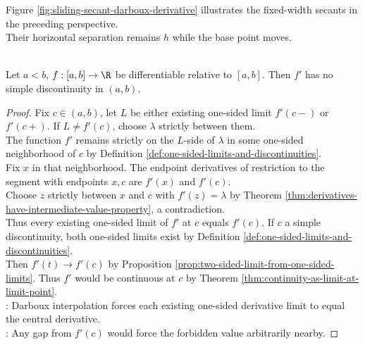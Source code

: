 \noindent Figure \ref{fig:sliding-secant-darboux-derivative} illustrates the fixed-width secants in the preceding perspective.\\
Their horizontal separation remains $h$ while the base point moves.

\begin{illustrationfigure}[H]
  \centering
  
  \caption{Fixed-width secants slide across the graph while retaining horizontal separation $h$.}
  \label{fig:sliding-secant-darboux-derivative}
\end{illustrationfigure}

\begin{corollary} \label{cor:derivatives-no-simple-discontinuities} \\
Let $a<b$, $f:[a,b]\to\R$ be differentiable relative to $[a,b]$. Then $f'$ has no simple discontinuity in $(a,b)$.
\begin{proof}
Fix $c\in(a,b)$, let $L$ be either existing one-sided limit $f'(c-)$ or $f'(c+)$. If $L\neq f'(c)$, choose $\lambda$ strictly between them.\\
The function $f'$ remains strictly on the $L$-side of $\lambda$ in some one-sided neighborhood of $c$ by Definition \ref{def:one-sided-limits-and-discontinuities}.\\
Fix $x$ in that neighborhood. The endpoint derivatives of restriction to the segment with endpoints $x,c$ are $f'(x)$ and $f'(c)$.\\
Choose $z$ strictly between $x$ and $c$ with $f'(z)=\lambda$ by Theorem \ref{thm:derivatives-have-intermediate-value-property}, a contradiction.\\
Thus every existing one-sided limit of $f'$ at $c$ equals $f'(c)$. If $c$ a simple discontinuity, both one-sided limits exist by Definition \ref{def:one-sided-limits-and-discontinuities}.\\
Then $f'(t)\to f'(c)$ by Proposition \ref{prop:two-sided-limit-from-one-sided-limits}. Thus $f'$ would be continuous at $c$ by Theorem \ref{thm:continuity-as-limit-at-limit-point}.\\
: Darboux interpolation forces each existing one-sided derivative limit to equal the central derivative.\\
: Any gap from $f'(c)$ would force the forbidden value arbitrarily nearby.
\end{proof}
\end{corollary}

